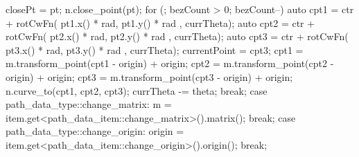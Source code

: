 \begin{codeblock}
{{{{      closePt = pt;
      n.close_point(pt);
    }
    for (; bezCount > 0; bezCount--) {
      auto cpt1 = ctr + rotCwFn({ pt1.x() * rad, pt1.y() * rad }, currTheta);
      auto cpt2 = ctr + rotCwFn({ pt2.x() * rad, pt2.y() * rad }, currTheta);
      auto cpt3 = ctr + rotCwFn({ pt3.x() * rad, pt3.y() * rad }, currTheta);
      currentPoint = cpt3;
      cpt1 = m.transform_point(cpt1 - origin) + origin;
      cpt2 = m.transform_point(cpt2 - origin) + origin;
      cpt3 = m.transform_point(cpt3 - origin) + origin;
      n.curve_to(cpt1, cpt2, cpt3);
      currTheta -= theta;
    }
  } break;
  case path_data_type::change_matrix:
  {
    m = item.get<path_data_item::change_matrix>().matrix();
  } break;
  case path_data_type::change_origin:
  {
    origin = item.get<path_data_item::change_origin>().origin();
  } break;
  }
}
\end{codeblock}

%
%
%
%	
%	
%
%
